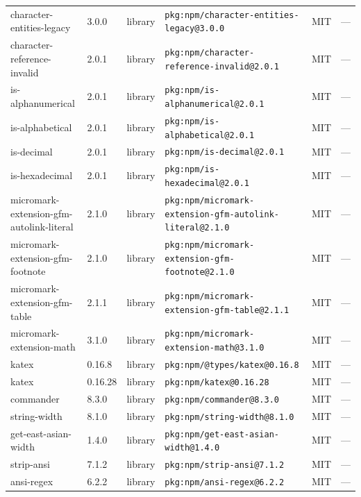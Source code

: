 \documentclass[11pt,a4paper]{article}
\begin{document}
\begin{longtable}{|p{4cm}|p{2cm}|p{1.6cm}|p{5cm}|p{1.5cm}|p{3.5cm}|}
\raggedright character-entities-legacy & 3.0.0 & library & \small\texttt{pkg:npm/character-entities-legacy@3.0.0} & MIT & \small — \\
\raggedright character-reference-invalid & 2.0.1 & library & \small\texttt{pkg:npm/character-reference-invalid@2.0.1} & MIT & \small — \\
\raggedright is-alphanumerical & 2.0.1 & library & \small\texttt{pkg:npm/is-alphanumerical@2.0.1} & MIT & \small — \\
\raggedright is-alphabetical & 2.0.1 & library & \small\texttt{pkg:npm/is-alphabetical@2.0.1} & MIT & \small — \\
\raggedright is-decimal & 2.0.1 & library & \small\texttt{pkg:npm/is-decimal@2.0.1} & MIT & \small — \\
\raggedright is-hexadecimal & 2.0.1 & library & \small\texttt{pkg:npm/is-hexadecimal@2.0.1} & MIT & \small — \\
\raggedright micromark-extension-gfm-autolink-literal & 2.1.0 & library & \small\texttt{pkg:npm/micromark-extension-gfm-autolink-literal@2.1.0} & MIT & \small — \\
\raggedright micromark-extension-gfm-footnote & 2.1.0 & library & \small\texttt{pkg:npm/micromark-extension-gfm-footnote@2.1.0} & MIT & \small — \\
\raggedright micromark-extension-gfm-table & 2.1.1 & library & \small\texttt{pkg:npm/micromark-extension-gfm-table@2.1.1} & MIT & \small — \\
\raggedright micromark-extension-math & 3.1.0 & library & \small\texttt{pkg:npm/micromark-extension-math@3.1.0} & MIT & \small — \\
\raggedright katex & 0.16.8 & library & \small\texttt{pkg:npm/@types/katex@0.16.8} & MIT & \small — \\
\raggedright katex & 0.16.28 & library & \small\texttt{pkg:npm/katex@0.16.28} & MIT & \small — \\
\raggedright commander & 8.3.0 & library & \small\texttt{pkg:npm/commander@8.3.0} & MIT & \small — \\
\raggedright string-width & 8.1.0 & library & \small\texttt{pkg:npm/string-width@8.1.0} & MIT & \small — \\
\raggedright get-east-asian-width & 1.4.0 & library & \small\texttt{pkg:npm/get-east-asian-width@1.4.0} & MIT & \small — \\
\raggedright strip-ansi & 7.1.2 & library & \small\texttt{pkg:npm/strip-ansi@7.1.2} & MIT & \small — \\
\raggedright ansi-regex & 6.2.2 & library & \small\texttt{pkg:npm/ansi-regex@6.2.2} & MIT & \small — \\

\end{longtable}
\end{document}
